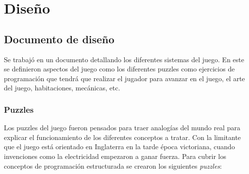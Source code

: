 \section{Diseño}
\subsection{Documento de diseño}
Se trabajó en un documento detallando los diferentes sistemas del juego. En este se definieron aspectos del juego como los diferentes puzzles como ejercicios de programación que tendrá que realizar el jugador para avanzar en el juego, el arte del juego, habitaciones, mecánicas, etc.

\subsubsection{Puzzles}
Los puzzles del juego fueron pensados para traer analogías del mundo real para explicar el funcionamiento de los diferentes conceptos a tratar. Con la limitante que el juego está orientado en Inglaterra en la tarde época victoriana, cuando invenciones como la electricidad empezaron a ganar fuerza.
Para cubrir los conceptos de programación estructurada se crearon los siguientes \textit{puzzles}:

